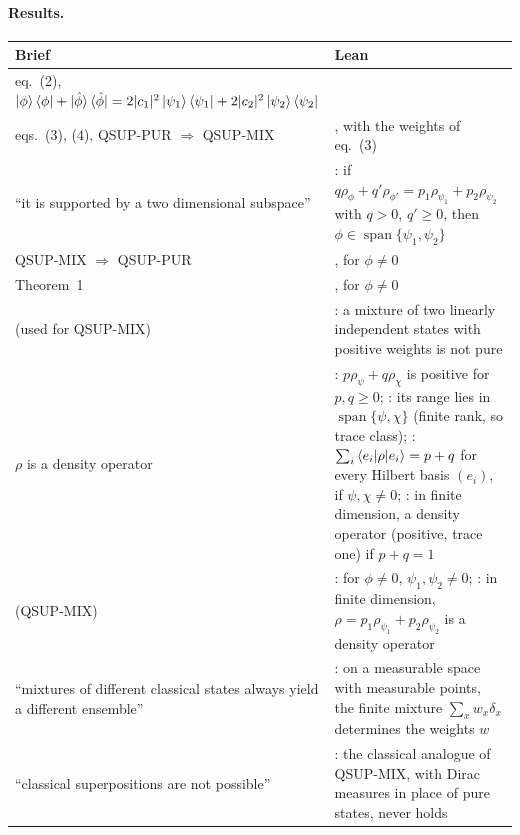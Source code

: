 \documentclass[11pt]{article}
\begin{document}
\paragraph{Results.}
\begin{center}
\begin{tabularx}{\textwidth}{@{}BL@{}}
\toprule
Brief & Lean \\
\midrule
eq.~(2), $\ket\phi\bra\phi + \ket{\hat\phi}\bra{\hat\phi} = 2|c_1|^2\ket{\psi_1}\bra{\psi_1} +
  2|c_2|^2\ket{\psi_2}\bra{\psi_2}$ &  \\
eqs.~(3), (4), QSUP-PUR $\Rightarrow$ QSUP-MIX & , with the weights of
  eq.~(3) \\
``it is supported by a two dimensional subspace'' & : if
  $q\rho_\phi + q'\rho_{\phi'} = p_1\rho_{\psi_1} + p_2\rho_{\psi_2}$ with $q > 0$, $q' \ge 0$,
  then $\phi \in \operatorname{span}\{\psi_1, \psi_2\}$ \\
QSUP-MIX $\Rightarrow$ QSUP-PUR & , for $\phi \ne 0$ \\
Theorem~1 & , for $\phi \ne 0$ \\
(used for QSUP-MIX) & : a mixture of two linearly independent states with
  positive weights is not pure \\
$\rho$ is a density operator & : $p\rho_\psi + q\rho_\chi$ is positive
  for $p, q \ge 0$; : its range lies in
  $\operatorname{span}\{\psi, \chi\}$ (finite rank, so trace class);
  : $\sum_i \braket{e_i|\rho|e_i} = p + q$ for every Hilbert basis
  $(e_i)$, if $\psi, \chi \ne 0$; : in finite dimension, a density
  operator (positive, trace one) if $p + q = 1$ \\
(QSUP-MIX) & : for $\phi \ne 0$, $\psi_1, \psi_2 \ne 0$;
  : in finite dimension, $\rho = p_1\rho_{\psi_1} + p_2\rho_{\psi_2}$ is a
  density operator \\
``mixtures of different classical states always yield a different ensemble'' &
  : on a measurable space with measurable points, the finite
  mixture $\sum_x w_x\delta_x$ determines the weights $w$ \\
``classical superpositions are not possible'' & : the classical analogue
   of QSUP-MIX, with Dirac measures in place of pure states, never holds \\
\bottomrule
\end{tabularx}
\end{center}
\end{document}

